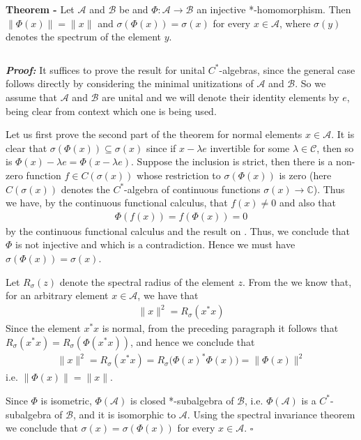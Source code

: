 \documentclass[12pt]{article}
\begin{document}
{\bf Theorem -} Let $\mathcal{A}$ and $\mathcal{B}$ be  and $\Phi : \mathcal{A} \longrightarrow \mathcal{B}$ an injective *-homomorphism. Then $\|\Phi(x)\|=\|x\|$ and $\sigma(\Phi(x)) = \sigma(x)$ for every $x \in \mathcal{A}$, where $\sigma(y)$ denotes the spectrum of the element $y$.

$\,$

{\bf \emph{Proof:}} It suffices to prove the result for unital $C^*$-algebras, since the general case follows directly by considering the minimal unitizations of $\mathcal{A}$ and $\mathcal{B}$. So we assume that $\mathcal{A}$ and $\mathcal{B}$ are unital and we will denote their identity elements by $e$, being clear from context which one is being used.

Let us first prove the second part of the theorem for normal elements $x \in \mathcal{A}$. It is clear that $\sigma(\Phi(x)) \subseteq \sigma(x)$ since if $x - \lambda e$ invertible for some $\lambda \in \mathcal{C}$, then so is $\Phi(x) - \lambda e = \Phi(x - \lambda e)$. Suppose the inclusion is strict, then there is a non-zero function $f \in C(\sigma(x))$ whose restriction to $\sigma(\Phi(x))$ is zero (here $C(\sigma(x))$ denotes the $C^*$-algebra of continuous functions $\sigma(x) \longrightarrow \mathbb{C}$). Thus we have, by the continuous functional calculus, that $f(x) \neq 0$ and also that
\begin{align*}
\Phi(f(x))=f(\Phi(x))=0
\end{align*}
by the continuous functional calculus and the result on . Thus, we conclude that $\Phi$ is not injective and which is a contradiction. Hence we must have $\sigma(\Phi(x)) = \sigma(x)$.

Let $R_{\sigma}(z)$ denote the spectral radius of the element $z$. From the  we know that, for an arbitrary element $x \in \mathcal{A}$, we have that
\begin{align*}
\|x\|^2=R_{\sigma}(x^*x)
\end{align*}
Since the element $x^*x$ is normal, from the preceding paragraph it follows that $R_{\sigma}(x^*x)=R_{\sigma}(\Phi(x^*x))$, and hence we conclude that
\begin{align*}
\|x\|^2=R_{\sigma}(x^*x)=R_{\sigma}\big(\Phi(x)^*\Phi(x)\big)= \|\Phi(x)\|^2
\end{align*}
i.e. $\|\Phi(x)\|=\|x\|$.

Since $\Phi$ is isometric, $\Phi(\mathcal{A})$ is closed *-subalgebra of $\mathcal{B}$, i.e. $\Phi(\mathcal{A})$ is a $C^*$-subalgebra of $\mathcal{B}$, and it is isomorphic to $\mathcal{A}$. Using the spectral invariance theorem we conclude that $\sigma(x)=\sigma(\Phi(x))$ for every $x \in \mathcal{A}$. $\square$
\end{document}
